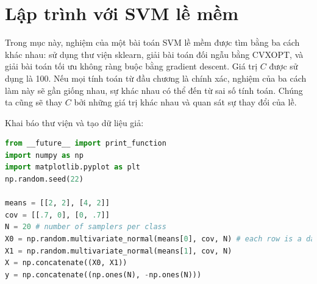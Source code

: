  
 
 
\section{Lập trình với SVM lề mềm}
Trong mục này, nghiệm của một bài toán SVM lề mềm được tìm bằng ba cách khác nhau: sử dụng thư viện sklearn, giải bài toán đối ngẫu
bằng CVXOPT, và giải bài toán tối ưu không ràng buộc bằng gradient
descent. Giá trị $C$ được sử dụng là 100.
Nếu mọi tính toán từ đầu chương là chính xác, nghiệm của ba cách làm này sẽ
gần giống nhau, sự khác nhau có thể đến từ sai số tính toán.
Chúng ta cũng sẽ thay $C$ bởi những giá trị khác nhau và quan sát sự thay đổi của lề. 
 
 
 
Khai báo thư viện và tạo dữ liệu giả:
 
\begin{lstlisting}[language=Python]
from __future__ import print_function
import numpy as np 
import matplotlib.pyplot as plt
np.random.seed(22)

means = [[2, 2], [4, 2]]
cov = [[.7, 0], [0, .7]]
N = 20 # number of samplers per class 
X0 = np.random.multivariate_normal(means[0], cov, N) # each row is a data point 
X1 = np.random.multivariate_normal(means[1], cov, N)
X = np.concatenate((X0, X1))
y = np.concatenate((np.ones(N), -np.ones(N)))
\end{lstlisting}

